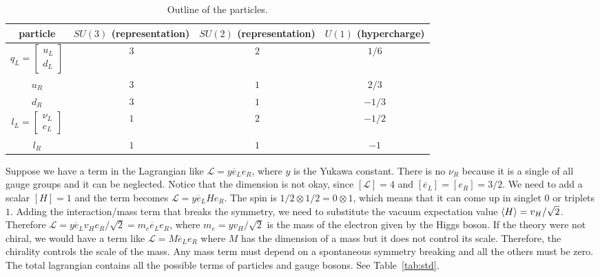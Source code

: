     \begin{table}[h!]
        \centering
        \begin{tabular}{c | c | c | c }
            particle & $SU(3)$ (representation) & $SU(2)$ (representation) & $U(1)$ (hypercharge)\\
            \hline
            $q_L = \begin{bmatrix} u_L \\ d_L \end{bmatrix}$ & $3$ & $2$ & $1/6$ \\ 
            $u_R$ & $3$ & $1$ & $2/3$ \\ 
            $d_R$ & $3$ & $1$ & $-1/3$ \\ 
            $l_L = \begin{bmatrix} \nu_L \\ e_L \end{bmatrix}$ & $1$ & $2$ & $-1/2$ \\ 
            $l_R$ & $1$ & $1$ & $-1$ \\ 
        \end{tabular}
        \caption{Outline of the particles.}
        \label{tab:par}
    \end{table}
    
    Suppose we have a term in the Lagrangian like $\mathcal L = y \overline e_L e_R$, where $y$ is the Yukawa constant. There is no $\nu_R$ because it is a single of all gauge groups and it can be neglected. Notice that the dimension is not okay, since $[\mathcal L] = 4$ and $[\overline e_L] = [e_R] = 3/2$. We need to add a scalar $[H] = 1$ and the term becomes $\mathcal L = y \overline e_L H e_R$. The spin is $1/2 \otimes 1/2 = 0 \otimes 1$, which means that it can come up in singlet $0$ or triplets $1$. Adding the interaction/mass term that breaks the symmetry, we need to substitute the vacuum expectation value $\langle H\rangle = v_H / \sqrt{2}$. Therefore $\mathcal L = y \overline e_L v_H e_R / \sqrt{2} = m_e \overline e_L e_R$, where $m_e = y v_H / \sqrt{2}$ is the mass of the electron given by the Higgs boson. If the theory were not chiral, we would have a term like $\mathcal L = M \overline e_L e_R$ where $M$ has the dimension of a mass but it does not control its scale. Therefore, the chirality controls the scale of the mass. Any mass term must depend on a spontaneous symmetry breaking and all the others must be zero. The total lagrangian contains all the possible terms of particles and gauge bosons. See Table~\ref{tab:std}. 

